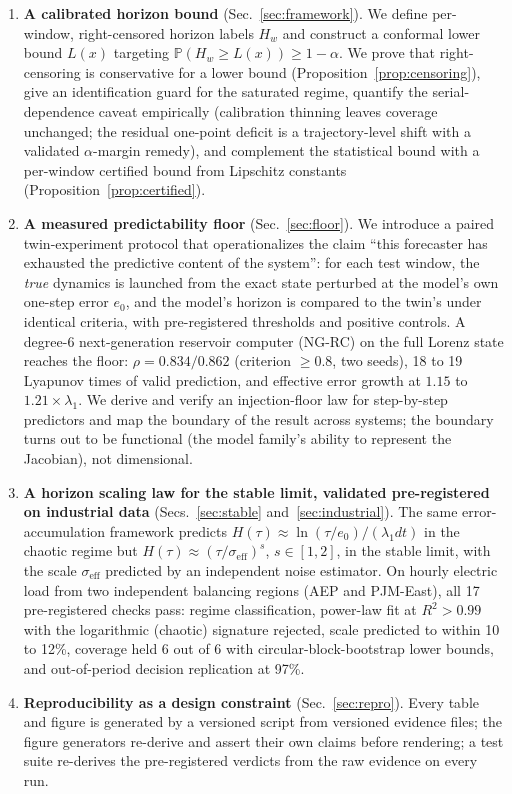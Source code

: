 \documentclass[aps,pre,twocolumn,superscriptaddress,nofootinbib,longbibliography]{revtex4-2}
\newcommand{\Hw}{H_w}
\newcommand{\eff}{\mathrm{eff}}
\begin{document}
\begin{enumerate}
  \item \textbf{A calibrated horizon bound} (Sec.~\ref{sec:framework}).
  We define per-window, right-censored horizon labels $\Hw$ and construct a
  conformal lower bound $L(x)$ targeting $\mathbb{P}(\Hw \ge L(x)) \ge
  1-\alpha$. We prove that right-censoring is conservative for a lower
  bound (Proposition~\ref{prop:censoring}), give an identification guard
  for the saturated regime, quantify the serial-dependence caveat
  empirically (calibration thinning leaves coverage unchanged; the
  residual one-point deficit is a trajectory-level shift with a validated
  $\alpha$-margin remedy), and complement the statistical bound with a
  per-window certified bound from Lipschitz constants
  (Proposition~\ref{prop:certified}).

  \item \textbf{A measured predictability floor} (Sec.~\ref{sec:floor}).
  We introduce a paired twin-experiment protocol that operationalizes the
  claim ``this forecaster has exhausted the predictive content of the
  system'': for each test window, the \emph{true} dynamics is launched
  from the exact state perturbed at the model's own one-step error $e_0$,
  and the model's horizon is compared to the twin's under identical
  criteria, with pre-registered thresholds and positive controls. A
  degree-6 next-generation reservoir computer (NG-RC) on the full Lorenz
  state reaches the floor: $\rho = 0.834/0.862$ (criterion $\ge 0.8$, two
  seeds), 18 to 19 Lyapunov times of valid prediction, and effective error
  growth at $1.15$ to $1.21\times\lambda_1$. We derive and verify an
  injection-floor law for step-by-step predictors and map the boundary of
  the result across systems; the boundary turns out to be functional (the
  model family's ability to represent the Jacobian), not dimensional.

  \item \textbf{A horizon scaling law for the stable limit, validated
  pre-registered on industrial data} (Secs.~\ref{sec:stable}
  and~\ref{sec:industrial}). The same error-accumulation framework
  predicts $H(\tau) \approx \ln(\tau/e_0)/(\lambda_1 dt)$ in the chaotic
  regime but $H(\tau) \approx (\tau/\sigma_\eff)^s$, $s \in [1,2]$, in the
  stable limit, with the scale $\sigma_\eff$ predicted by an independent
  noise estimator. On hourly electric load from two independent balancing
  regions (AEP and PJM-East), all 17 pre-registered checks pass: regime
  classification, power-law fit at $R^2 > 0.99$ with the logarithmic
  (chaotic) signature rejected, scale predicted to within 10 to 12\%,
  coverage held 6 out of 6 with circular-block-bootstrap lower bounds, and
  out-of-period decision replication at 97\%.

  \item \textbf{Reproducibility as a design constraint}
  (Sec.~\ref{sec:repro}). Every table and figure is generated by a
  versioned script from versioned evidence files; the figure generators
  re-derive and assert their own claims before rendering; a test suite
  re-derives the pre-registered verdicts from the raw evidence on every
  run.
\end{enumerate}
\end{document}
